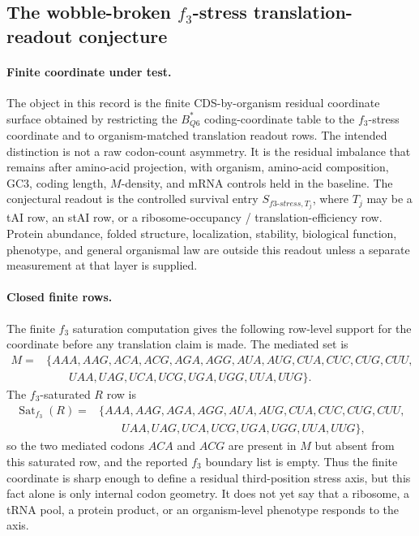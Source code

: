 \subsection{The wobble-broken $f_3$-stress translation-readout conjecture}
\label{sec:q6-f3-stress-wobble-broken-translation-readout-cross-layer}

\paragraph{Finite coordinate under test.}
The object in this record is the finite CDS-by-organism residual coordinate surface obtained by restricting the $B^*_{Q6}$ coding-coordinate table to the $f_3$-stress coordinate and to organism-matched translation readout rows.  The intended distinction is not a raw codon-count asymmetry.  It is the residual imbalance that remains after amino-acid projection, with organism, amino-acid composition, GC3, coding length, $M$-density, and mRNA controls held in the baseline.  The conjectural readout is the controlled survival entry $S_{f3\text{-}stress,T_j}$, where $T_j$ may be a tAI row, an stAI row, or a ribosome-occupancy / translation-efficiency row.  Protein abundance, folded structure, localization, stability, biological function, phenotype, and general organismal law are outside this readout unless a separate measurement at that layer is supplied.

\paragraph{Closed finite rows.}
The finite $f_3$ saturation computation gives the following row-level support for the coordinate before any translation claim is made.  The mediated set is
$$
\begin{aligned}
M={}&\{AAA,AAG,ACA,ACG,AGA,AGG,AUA,AUG,CUA,CUC,CUG,CUU,\\
&\qquad UAA,UAG,UCA,UCG,UGA,UGG,UUA,UUG\}.
\end{aligned}
$$
The $f_3$-saturated $R$ row is
$$
\begin{aligned}
\operatorname{Sat}_{f_3}(R)={}&\{AAA,AAG,AGA,AGG,AUA,AUG,CUA,CUC,CUG,CUU,\\
&\qquad UAA,UAG,UCA,UCG,UGA,UGG,UUA,UUG\},
\end{aligned}
$$
so the two mediated codons $ACA$ and $ACG$ are present in $M$ but absent from this saturated row, and the reported $f_3$ boundary list is empty.  Thus the finite coordinate is sharp enough to define a residual third-position stress axis, but this fact alone is only internal codon geometry.  It does not yet say that a ribosome, a tRNA pool, a protein product, or an organism-level phenotype responds to the axis.

